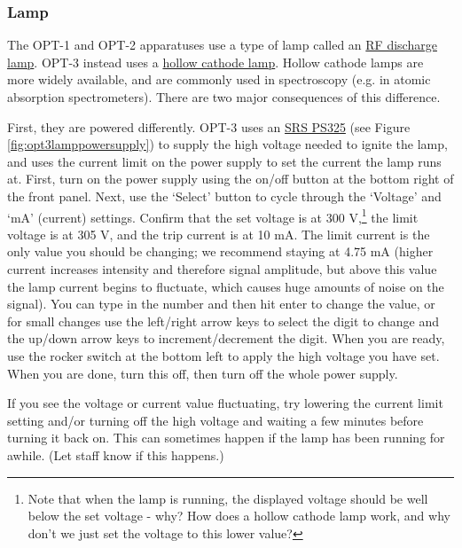 \documentclass{../lab}
\begin{document}
\subsubsection{Lamp}
The OPT-1 and OPT-2 apparatuses use a type of lamp called an \href{https://link.springer.com/chapter/10.1007/978-981-15-3548-2_7}{RF discharge lamp}. OPT-3 instead uses a \href{https://en.wikipedia.org/wiki/Hollow-cathode_lamp}{hollow cathode lamp}. Hollow cathode lamps are more widely available, and are commonly used in spectroscopy (e.g. in atomic absorption spectrometers). There are two major consequences of this difference.

First, they are powered differently. OPT-3 uses an \href{https://drive.google.com/file/d/102ZDUKkjeEjn9zsKbq845126XYzioNHp/view?usp=drive_link}{SRS PS325} (see Figure \ref{fig:opt3lamppowersupply}) to supply the high voltage needed to ignite the lamp, and uses the current limit on the power supply to set the current the lamp runs at. First, turn on the power supply using the on/off button at the bottom right of the front panel. Next, use the `Select' button to cycle through the `Voltage' and `mA' (current) settings. Confirm that the set voltage is at 300 V,\footnote{Note that when the lamp is running, the displayed voltage should be well below the set voltage - why? How does a hollow cathode lamp work, and why don't we just set the voltage to this lower value?} the limit voltage is at 305 V, and the trip current is at 10 mA. The limit current is the only value you should be changing; we recommend staying at 4.75 mA (higher current increases intensity and therefore signal amplitude, but above this value the lamp current begins to fluctuate, which causes huge amounts of noise on the signal). You can type in the number and then hit enter to change the value, or for small changes use the left/right arrow keys to select the digit to change and the up/down arrow keys to increment/decrement the digit. When you are ready, use the rocker switch at the bottom left to apply the high voltage you have set. When you are done, turn this off, then turn off the whole power supply. %

If you see the voltage or current value fluctuating, try lowering the current limit setting and/or turning off the high voltage and waiting a few minutes before turning it back on. This can sometimes happen if the lamp has been running for awhile. (Let staff know if this happens.)
\end{document}
